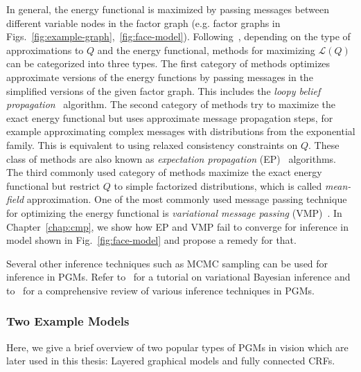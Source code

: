 In general, the energy functional is maximized by passing messages between different
variable nodes in the factor graph (e.g. factor graphs in
Figs.~\ref{fig:example-graph},~\ref{fig:face-model}).
Following~\cite{koller2009probabilistic}, depending on the type of approximations
to $Q$ and the energy functional, methods for maximizing $\mathcal{L}(Q)$ can
be categorized into three types. The first category of methods optimizes approximate
versions of the energy functions by passing messages in the simplified versions of the
given factor graph. This includes the
\textit{loopy belief propagation}~\cite{frey1998revolution,weiss2000correctness} algorithm.
The second category of methods try to maximize the exact energy functional but
uses approximate message propagation steps, for example approximating complex
messages with distributions from the exponential family. This is equivalent to using
relaxed consistency constraints on $Q$. These class of methods are also known as
\textit{expectation propagation} (EP)~\cite{Minka2001} algorithms.
The third commonly used category of methods maximize the exact energy functional
but restrict $Q$ to simple factorized distributions, which is called \textit{mean-field}
approximation. One of the most commonly used message passing technique for
optimizing the energy functional is \textit{variational message passing} (VMP)~\cite{Winn2005}.
In Chapter~\ref{chap:cmp}, we show how EP and VMP fail to converge for inference
in model shown in Fig.~\ref{fig:face-model} and propose a remedy for that.

Several other inference techniques such as MCMC sampling can be used for inference
in PGMs. Refer to~\cite{fox2012tutorial} for a tutorial on variational Bayesian
inference and to~\cite{koller2009probabilistic,wainwright2008graphical}
for a comprehensive review of various inference techniques in PGMs.

\subsubsection{Two Example Models}
\label{sec:example_modesl_crf}
Here, we give a brief overview of two popular types of
PGMs in vision which are later used in this thesis:
Layered graphical models and fully connected CRFs.

